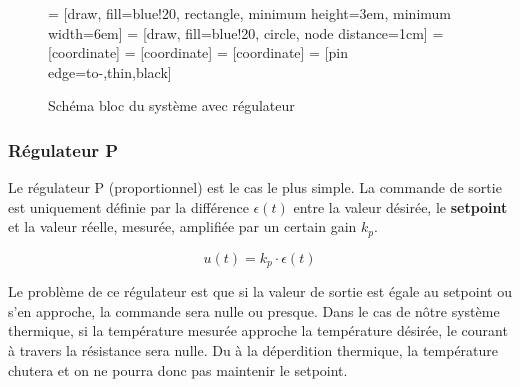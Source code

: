 \begin{figure}[H]	
    \centering
    
     = [draw, fill=blue!20, rectangle, minimum height=3em, minimum width=6em]
     = [draw, fill=blue!20, circle, node distance=1cm]
     = [coordinate]
     = [coordinate]
     = [coordinate]
     = [pin edge={to-,thin,black}]

    \caption{Schéma bloc du système avec régulateur}
\end{figure}

\subsubsection{Régulateur P}
Le régulateur P (proportionnel) est le cas le plus simple.
La commande de sortie est uniquement définie par la différence 
$\epsilon(t)$ entre la valeur désirée, le \textbf{setpoint} et
la valeur réelle, mesurée, amplifiée par un certain gain $k_p$.

$$u(t) = k_p \cdot \epsilon(t)$$

Le problème de ce régulateur est que si la valeur de sortie est
égale au setpoint ou s'en approche, la commande sera nulle ou
presque. Dans le cas de nôtre système thermique, si la température
mesurée approche la température désirée, le courant à travers la
résistance sera nulle. Du à la déperdition thermique, la température
chutera et on ne pourra donc pas maintenir le setpoint.\\

